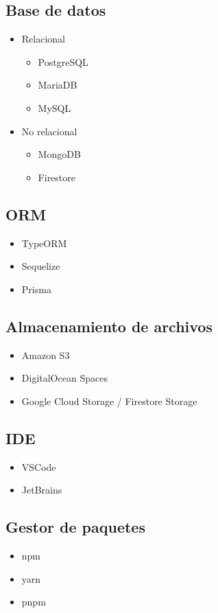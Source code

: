 \subsection{Base de datos}
\begin{itemize}
    \item Relacional
    \begin{itemize}
        \item PostgreSQL
        \item MariaDB
        \item MySQL
    \end{itemize}
    \item No relacional
    \begin{itemize}
        \item MongoDB
        \item Firestore
    \end{itemize}
\end{itemize}

\subsection{ORM}
\begin{itemize}
    \item TypeORM
    \item Sequelize
    \item Prisma
\end{itemize}

\subsection{Almacenamiento de archivos}
\begin{itemize}
    \item Amazon S3
    \item DigitalOcean Spaces
    \item Google Cloud Storage / Firestore Storage
\end{itemize}

\subsection{IDE}
\begin{itemize}
    \item VSCode
    \item JetBrains
\end{itemize}

\subsection{Gestor de paquetes}
\begin{itemize}
    \item npm
    \item yarn
    \item pnpm
\end{itemize}


